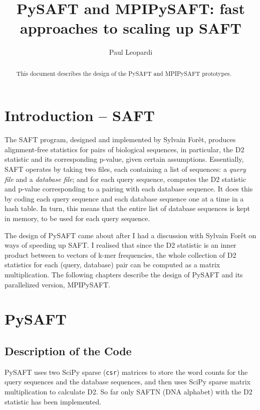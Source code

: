 \documentclass[11pt]{report}
\title{PySAFT and MPIPySAFT: fast approaches to scaling up SAFT}
\author{Paul Leopardi}
\begin{document}
\maketitle

\begin{abstract}
This document describes the design of the PySAFT and MPIPySAFT prototypes.
\end{abstract}
\chapter{Introduction -- SAFT}
The SAFT program, designed and implemented by Sylvain For\^et,
produces alignment-free statistics for pairs of biological sequences,
in particular, the D2 statistic and its corresponding p-value, given certain assumptions.
Essentially, SAFT operates by taking two files, each containing a list of sequences: 
a \emph{query file} and a \emph{database file}; 
and for each query sequence, computes the D2 statistic and p-value corresponding to a pairing
with each database sequence. 
It does this by coding each query sequence and each database sequence one at a time in a hash table. 
In turn, this means that the entire list of database sequences is kept in memory,
to be used for each query sequence.

The design of PySAFT came about after I had a discussion with Sylvain For\^et on ways of speeding up SAFT.
I realised that since the D2 statistic is an inner product between to vectors of k-mer frequencies,
the whole collection of D2 statistics for each (query, database) pair can be computed as a matrix multiplication.
The following chapters describe the design of PySAFT and its parallelized version, MPIPySAFT.
\chapter{PySAFT}
\section{Description of the Code}

PySAFT uses two SciPy sparse (\verb!csr!) matrices to store the word counts for the 
query sequences and the database sequences, and then uses SciPy sparse 
matrix multiplication to calculate D2. 
So far only SAFTN (DNA alphabet) with the D2 statistic has been implemented. 
\end{document}

